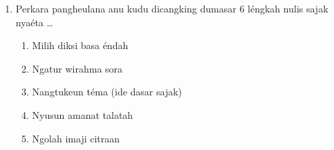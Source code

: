 \documentclass[12pt,a4paper]{article}
\begin{document}
\begin{enumerate}[leftmargin=*]
\item Perkara pangheulana anu kudu dicangking dumasar 6 léngkah nulis sajak nyaéta \dots
    \begin{enumerate}[label=\alph*.]
        \item Milih diksi basa éndah
        \item Ngatur wirahma sora
        \item Nangtukeun téma (ide dasar sajak)
        \item Nyusun amanat talatah
        \item Ngolah imaji citraan
    \end{enumerate}

\end{enumerate}
\end{document}
